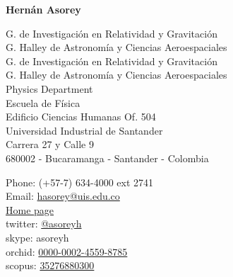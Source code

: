 \begin{center}{\huge \bf Hernán Asorey}\\[1cm]\end{center}

\begin{minipage}[t]{0.595\textwidth}
\ifeng
  G. de Investigación en Relatividad y Gravitación \\
  G. Halley de Astronomía y Ciencias Aeroespaciales \\
\else
  G. de Investigación en Relatividad y Gravitación \\
  G. Halley de Astronomía y Ciencias Aeroespaciales \\
\fi
\ifeng 
  Physics Department\\
\else
  Escuela de Física\\
\fi
  Edificio Ciencias Humanas Of. 504\\
  Universidad Industrial de Santander\\
  Carrera 27 y Calle 9\\
  680002 - Bucaramanga - Santander - Colombia\\
  [.2cm]
\end{minipage}
\begin{minipage}[t]{0.395\textwidth}
  Phone: (+57-7) 634-4000 ext 2741\\
  Email: \href{mailto:hasorey@uis.edu.co}{hasorey@uis.edu.co}\\
  \href{http://fisica.cab.cnea.gov.ar/particulas/wiki/User:Asoreyh}{Home page}\\
  twitter: \href{https://twitter.com/#!/asoreyh}{@asoreyh}\\
  skype: asoreyh\\
  orchid: \href{http://orcid.org/0000-0002-4559-8785}{0000-0002-4559-8785}\\
  scopus: \href{http://www.scopus.com/authid/detail.url?authorId=35276880300}{35276880300}
\end{minipage}


